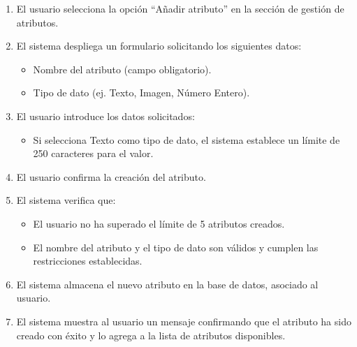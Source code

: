 \begin{enumerate}
    \item El usuario selecciona la opción “Añadir atributo” en la sección de gestión de atributos.
    \item El sistema despliega un formulario solicitando los siguientes datos:
    \begin{itemize}
        \item Nombre del atributo (campo obligatorio).
        \item Tipo de dato (ej. Texto, Imagen, Número Entero).
    \end{itemize}
    \item El usuario introduce los datos solicitados:
    \begin{itemize}
        \item Si selecciona Texto como tipo de dato, el sistema establece un límite de 250 caracteres para el valor.
    \end{itemize}
    \item El usuario confirma la creación del atributo.
    \item El sistema verifica que:
    \begin{itemize}
        \item El usuario no ha superado el límite de 5 atributos creados.
        \item El nombre del atributo y el tipo de dato son válidos y cumplen las restricciones establecidas.
    \end{itemize}
    \item El sistema almacena el nuevo atributo en la base de datos, asociado al usuario.
    \item El sistema muestra al usuario un mensaje confirmando que el atributo ha sido creado con éxito y lo agrega a la lista de atributos disponibles.
\end{enumerate}


